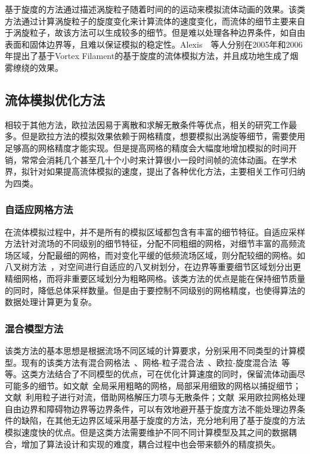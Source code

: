 基于旋度的方法通过描述涡旋粒子随着时间的的运动来模拟流体动画的效果。该类方法通过计算涡旋粒子的旋度变化来计算流体的速度变化，而流体的细节主要来自于涡旋粒子，故该方法可以生成较多的细节。但是难以处理各种边界条件，如自由表面和固体边界等，且难以保证模拟的稳定性。Alexis~\cite{angelidis2005simulation}~\cite{angelidis2006controllable}等人分别在2005年和2006年提出了基于Vortex Filament的基于旋度的流体模拟方法，并且成功地生成了烟雾缭绕的效果。

\subsection{流体模拟优化方法}
\label{sec:optimization}
相较于其他方法，欧拉法因易于离散和求解无散条件等优点，相关的研究工作最多。但是欧拉方法的模拟效果依赖于网格精度，想要模拟出涡旋等细节，需要使用足够高的网格精度才能实现。但是提高网格的精度会大幅度地增加模拟的时间开销，常常会消耗几个甚至几十个小时来计算很小一段时间帧的流体动画。在学术界，拟针对如果提高流体模拟的速度，提出了各种优化方法，主要相关工作可归纳为四类。

\subsubsection{自适应网格方法}
\label{sec:adaptive-gird}

在流体模拟过程中，并不是所有的模拟区域都包含有丰富的细节特征。自适应采样方法针对流场的不同级别的细节特征，分配不同粗细的网格，对细节丰富的高频流场区域，分配最细的网格，而对变化平缓的低频流场区域，则分配较细的网格。如八叉树方法~\cite{losasso2004simulating}，对空间进行自适应的八叉树划分，在边界等重要细节区域划分出更精细网格，而将非重要区域划分为粗略网格。该类方法的优点是能在保持细节质量的同时，降低总体采样数量。但是由于要控制不同级别的网格精度，也使得算法的数据处理计算更为复杂。

\subsubsection{混合模型方法}
\label{sec:mix-model}

该类方法的基本思想是根据流场不同区域的计算要求，分别采用不同类型的计算模型。现有的该类方法有混合网格法~\cite{dobashi2008fast}、网格-粒子混合法~\cite{zhu2010creating}、欧拉-旋度混合法~\cite{golas2012large}等等。这类方法结合了不同模型的优点，可在优化计算速度的同时，保留流体动画尽可能多的细节。如文献~\cite{dobashi2008fast}全局采用粗略的网格，局部采用细致的网格以捕捉细节；文献~\cite{zhu2010creating}利用粒子进行对流，借助网格解压力项与无散条件；文献~\cite{golas2012large}采用欧拉网格处理自由边界和障碍物边界等边界条件，可以有效地避开基于旋度方法不能处理边界条件的缺陷，在其他无边界区域采用基于旋度的方法，充分地利用了基于旋度的方法模拟速度快的优点。但是这类方法需要维护不同不同计算模型及其之间的数据耦合，增加了算法设计和实现的难度，耦合过程中也会带来额外的精度损失。

